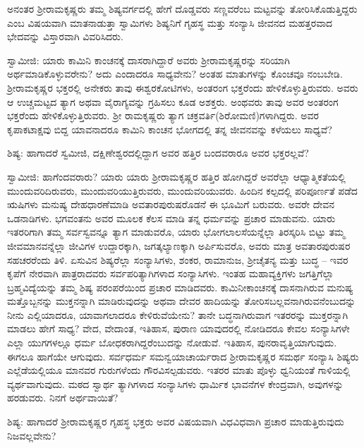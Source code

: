 ಅನಂತರ ಶ‍್ರೀರಾಮಕೃಷ್ಣರು ತಮ್ಮ ಶಿಷ್ಯವರ್ಗದಲ್ಲಿ ಹೇಗೆ ದೊಡ್ಡವರು ಸಣ್ಣವರೆಂಬ ಮಟ್ಟವನ್ನು ತೋರಿಸಿಕೊಡುತ್ತಿದ್ದರು ಎಂಬ ವಿಷಯವಾಗಿ ಮಾತನಾಡುತ್ತಾ ಸ್ವಾಮಿಗಳು ಶಿಷ್ಯನಿಗೆ ಗೃಹಸ್ಥ ಮತ್ತು ಸಂನ್ಯಾಸಿ ಜೀವನದ ಮಹತ್ತರವಾದ ಭೇದವನ್ನು ವಿಸ್ತಾರವಾಗಿ ವಿವರಿಸಿದರು.

ಸ್ವಾಮೀಜಿ: ಯಾರು ಕಾಮಿನಿ ಕಾಂಚನಕ್ಕೆ ದಾಸರಾಗಿದ್ದಾರೆ ಅವರು ಶ‍್ರೀರಾಮಕೃಷ್ಣರನ್ನು ಸರಿಯಾಗಿ ಅರ್ಥಮಾಡಿಕೊಳ್ಳುವರೇನು? ಅದು ಎಂದಾದರೂ ಸಾಧ್ಯವೇನು? ಅಂತಹ ಮಾತುಗಳನ್ನು ಕೊಂಚವೂ ನಂಬಬೇಡಿ. ಶ‍್ರೀರಾಮಕೃಷ್ಣರ ಭಕ್ತರಲ್ಲಿ ಅನೇಕರು ತಾವು ಈಶ್ವರಕೋಟಿಗಳು, ಅಂತರಂಗ ಭಕ್ತರೆಂದು ಹೇಳಿಕೊಳ್ಳುತ್ತಿರುವರು. ಅವರು ಆ ಉಚ್ಚಮಟ್ಟದ ತ್ಯಾಗ ಅಥವಾ ವೈರಾಗ್ಯವನ್ನು ಗ್ರಹಿಸಲು ಕೂಡ ಅಶಕ್ತರು. ಅಂಥವರು ತಾವು ಅವರ ಅಂತರಂಗ ಭಕ್ತರೆಂದು ಹೇಳಿಕೊಳ್ಳುತ್ತಿರುವರು. ಶ‍್ರೀ ರಾಮಕೃಷ್ಣರು ತ್ಯಾಗ ಚಕ್ರವರ್ತಿ(ಶಿರೋಮಣಿ)ಗಳಾಗಿದ್ದರು. ಅವರ ಕೃಪಾಕಟಾಕ್ಷವು ಬಿದ್ದ ಯಾವನಾದರೂ ಕಾಮಿನಿ ಕಾಂಚನ ಭೋಗದಲ್ಲಿ ತನ್ನ ಜೀವನವನ್ನು ಕಳೆಯಲು ಸಾಧ್ಯವೆ?

ಶಿಷ್ಯ: ಹಾಗಾದರೆ ಸ್ವಮೀಜಿ, ದಕ್ಷಿಣೇಶ್ವರದಲ್ಲಿದ್ದಾಗ ಅವರ ಹತ್ತಿರ ಬಂದವರಾರೂ ಅವರ ಭಕ್ತರಲ್ಲವೆ?

ಸ್ವಾಮೀಜಿ: ಹಾಗೆಂದವರಾರು? ಯಾರು ಯಾರು ಶ‍್ರೀರಾಮಕೃಷ್ಣರ ಹತ್ತಿರ ಹೋಗಿದ್ದರೆ ಅವರೆಲ್ಲಾ ಆಧ್ಯಾತ್ಮಿಕತೆಯಲ್ಲಿ ಮುಂದುವರಿದಿರುವರು, ಮುಂದುವರಿಯುತ್ತಿರುವರು, ಮುಂದುವರಿಯುವರು. ಹಿಂದಿನ ಕಲ್ಪದಲ್ಲಿ ಪರಿಪೂರ್ಣತೆ ಪಡೆದ ಋಷಿಗಳು ಮನುಷ್ಯ ದೇಹಧಾರಣೆಮಾಡಿ ಅವತಾರಪುರುಷರೊಡನೆ ಈ ಭೂಮಿಗೆ ಬರುವರು. ಅವರೇ ದೇವನ ಒಡನಾಡಿಗಳು. ಭಗವಂತನು ಅವರ ಮೂಲಕ ಕೆಲಸ ಮಾಡಿ ತನ್ನ ಧರ್ಮವನ್ನು ಪ್ರಚಾರ ಮಾಡುವನು. ಯಾರು ಇತರರಿಗಾಗಿ ತಮ್ಮ ಸರ್ವಸ್ವವನ್ನೂ ತ್ಯಾಗ ಮಾಡುವರೊ, ಯಾರು ಭೋಗಲಾಲಸೆಯನ್ನೆಲ್ಲಾ ತಿರಸ್ಕರಿಸಿ ಬಿಟ್ಟು ತಮ್ಮ ಜೀವಮಾನವನ್ನೆಲ್ಲಾ ಜೀವಿಗಳ ಉದ್ದಾರಕ್ಕಾಗಿ, ಜಗತ್ಕಲ್ಯಾಣಕ್ಕಾಗಿ ಅರ್ಪಿಸುವರೊ, ಅವರು ಮಾತ್ರ ಅವತಾರಪುರುಷರ ಸಹಚರರೆಂದು ತಿಳಿ. ಏಸುವಿನ ಶಿಷ್ಯರೆಲ್ಲಾ ಸಂನ್ಯಾಸಿಗಳು, ಶಂಕರ, ರಾಮಾನುಜ, ಶ‍್ರೀಚೈತನ್ಯ ಮತ್ತು ಬುದ್ಧ – ಇವರ ಕೃಪೆಗೆ ನೇರವಾಗಿ ಪಾತ್ರರಾದವರು ಸರ್ವಪರಿತ್ಯಾಗಿಗಳಾದ ಸಂನ್ಯಾಸಿಗಳು. ಇಂತಹ ಮಹಾವ್ಯಕ್ತಿಗಳು ಜಗತ್ತಿಗೆಲ್ಲಾ ಬ್ರಹ್ಮವಿದ್ಯೆಯನ್ನು ತಮ್ಮ ಶಿಷ್ಯ ಪರಂಪರೆಯಿಂದ ಪ್ರಚಾರ ಮಾಡಿದವರು. ಕಾಮಿನೀಕಾಂಚನಕ್ಕೆ ದಾಸನಾಗಿರುವ ಮನುಷ್ಯ ಮತ್ತೊಬ್ಬನನ್ನು ಮುಕ್ತನನ್ನಾಗಿ ಮಾಡಿರುವುದನ್ನು ಅಥವಾ ದೇವರ ಹಾದಿಯನ್ನು ತೋರಿಸಬಲ್ಲವನಾಗಿರುವನೆಂಬುದನ್ನು ನೀನು ಎಲ್ಲಿಯಾದರೂ, ಯಾವಾಗಲಾದರೂ ಕೇಳಿರುವೆಯೇನು? ತಾನೇ ಬದ್ಧನಾಗಿರುವಾಗ ಇತರರನ್ನು ಮುಕ್ತರನ್ನಾಗಿ ಮಾಡಲು ಹೇಗೆ ಸಾಧ್ಯ? ವೇದ, ವೇದಾಂತ, ಇತಿಹಾಸ, ಪುರಾಣ ಯಾವುದರಲ್ಲಿ ನೋಡಿದರೂ ಕೇವಲ ಸಂನ್ಯಾಸಿಗಳೇ ಎಲ್ಲಾ ಯುಗಗಳಲ್ಲೂ ಧರ್ಮ ಬೋಧಕರಾಗಿದ್ದರೆಂಬುದನ್ನು ನೋಡುವೆ. ಇತಿಹಾಸ, ಪುನರಾವೃತ್ತಿಯಾಗುವುದು. ಈಗಲೂ ಹಾಗೆಯೇ ಆಗುವುದು. ಸರ್ವಧರ್ಮ ಸಮನ್ವಯಾಚಾರ್ಯರಾದ ಶ‍್ರೀರಾಮಕೃಷ್ಣರ ಸಮರ್ಥ ಸಂನ್ಯಾಸಿ ಶಿಷ್ಯರು ಎಲ್ಲೆಡೆಯಲ್ಲಿಯೂ ಮಾನವರ ಗುರುಗಳೆಂದು ಗೌರವಿಸಲ್ಪಡುವರು. ಇತರರ ಮಾತು ಪೊಳ್ಳು ಧ್ವನಿಯಂತೆ ಗಾಳಿಯಲ್ಲಿ ವ್ಯರ್ಥವಾಗುವುದು. ಮಠದ ಸ್ವಾರ್ಥ ತ್ಯಾಗಿಗಳಾದ ಸಂನ್ಯಾಸಿಗಳು ಧಾರ್ಮಿಕ ಭಾವನೆಗಳ ಕೇಂದ್ರವಾಗಿ, ಅವುಗಳನ್ನು ಹರಡುವರು. ನಿನಗೆ ಅರ್ಥವಾಯಿತೆ?

ಶಿಷ್ಯ: ಹಾಗಾದರೆ ಶ‍್ರೀರಾಮಕೃಷ್ಣರ ಗೃಹಸ್ಥ ಭಕ್ತರು ಅವರ ವಿಷಯವಾಗಿ ವಿಧವಿಧವಾಗಿ ಪ್ರಚಾರ ಮಾಡುತ್ತಿರುವುದು ನಿಜವಲ್ಲವೇನು?

